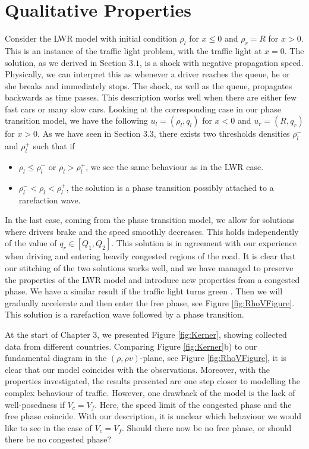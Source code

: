 \documentclass[10pt]{article}
\numberwithin{equation}{section}
\begin{document}
\section{Qualitative Properties}
Consider the LWR model with initial condition $\rho_l$ for $ x \leq 0$ and $\rho_r = R$ for $ x > 0$. This is an instance of the traffic light problem, with the traffic light at $x = 0$. The solution, as we derived in Section $3.1$, is a shock with negative propagation speed. Physically, we can interpret this as whenever a driver reaches the queue, he or she breaks and immediately stops. The shock, as well as the queue, propagates backwards as time passes. This description works well when there are either few fast cars or many slow cars. Looking at the corresponding case in our phase transition model, we have the following $u_l = (\rho_l, q_l)$ for $ x < 0$ and $u_r = (R, q_r)$ for $ x > 0$. As we have seen in Section $3.3$, there exists two thresholds densities $\rho_l^-$ and $\rho_l^+$ such that if
\begin{itemize}
    \item $\rho_l \leq \rho_l^-$ or $\rho_l > \rho_l^+$, we see the same behaviour as in the LWR case. 
    \item $\rho_l^- < \rho_l < \rho_l^+$, the solution is a phase transition possibly attached to a rarefaction wave.
\end{itemize}
In the last case, coming from the phase transition model, we allow for solutions where drivers brake and the speed smoothly decreases. This holds independently of the value of $q_r \in [Q_1, Q_2]$\cite{Colombo2003}. This solution is in agreement with our experience when driving and entering heavily congested regions of the road. It is clear that our stitching of the two solutions works well, and we have managed to preserve the properties of the LWR model and introduce new properties from a congested phase. We have a similar result if the traffic light turns green \cite{Colombo2003}. Then we will gradually accelerate and then enter the free phase, see Figure \ref{fig:RhoVFigure}. This solution is a rarefaction wave followed by a phase transition. 

At the start of Chapter $3$, we presented Figure \ref{fig:Kerner}, showing collected data from different countries. Comparing Figure \ref{fig:Kerner}b) to our fundamental diagram in the $(\rho, \rho v)$-plane, see Figure \ref{fig:RhoVFigure}, it is clear that our model coincides with the observations. Moreover, with the properties investigated, the results presented are one step closer to modelling the complex behaviour of traffic. However, one drawback of the model is the lack of well-posedness if $V_c = V_f$. Here, the speed limit of the congested phase and the free phase coincide. With our description, it is unclear which behaviour we would like to see in the case of $V_c = V_f$. Should there now be no free phase, or should there be no congested phase? 
\end{document}
